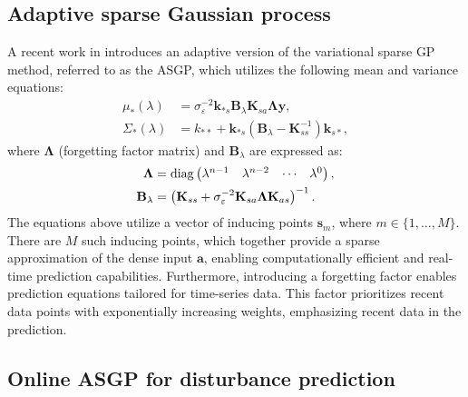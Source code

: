  
\subsection{Adaptive sparse Gaussian process}
A recent work in \cite{asgp} introduces an adaptive version of the variational sparse GP method, referred to as the \ac{ASGP}, which utilizes the following mean and variance equations:
%
\begin{align}
	\mu_*(\lambda) &= \sigma^{-2}_\varepsilon\bm{k}_{*s}\bm{B}_\lambda\bm{K}_{sa}\bm{\Lambda}\bm{y}, \label{eq:pred_asgp1}\\
	\Sigma_*(\lambda) &= k_{**} + \bm{k}_{*s}\left(\bm{B}_\lambda-\bm{K}_{ss}^{-1}\right)\bm{k}_{s*}, \label{eq:pred_asgp2}
\end{align}
%
where $\bm{\Lambda}$ (forgetting factor matrix) and $\bm{B}_\lambda$ are expressed as:
%
\begin{align}
	\bm{\Lambda} &= {\rm diag}\left(
	\begin{matrix}
		\lambda^{n-1} & \lambda^{n-2} & \cdots & \lambda^0
	\end{matrix}\right), \label{eq:pred_asgp3}\\
	\bm{B}_\lambda &= \left(\bm{K}_{ss}+\sigma^{-2}_\varepsilon\bm{K}_{sa}\bm{\Lambda}\bm{K}_{as}\right)^{-1}. \label{eq:pred_asgp4}
\end{align}
%
The equations above utilize a vector of inducing points \( \mathbf{s}_m \), where \( m \in \{1, \ldots, M\} \). There are \( M \) such inducing points, which together provide a sparse approximation of the dense input \( \mathbf{a} \), enabling computationally efficient and real-time prediction capabilities. Furthermore, introducing a forgetting factor enables prediction equations tailored for time-series data. This factor prioritizes recent data points with exponentially increasing weights, emphasizing recent data in the prediction. %




 
 
\subsection{Online ASGP for disturbance prediction}

